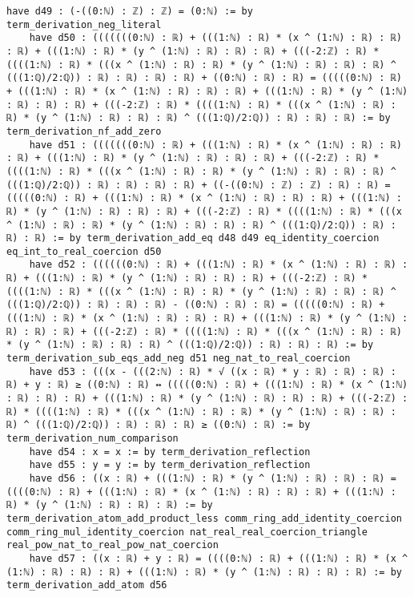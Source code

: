\documentclass{article}
\begin{document}
\begin{tcolorbox}[colback=white!10, width=\linewidth]
\begin{lstlisting}[language=Lean4]
    have d49 : (-((0:ℕ) : ℤ) : ℤ) = (0:ℕ) := by term_derivation_neg_literal
    have d50 : (((((((0:ℕ) : ℝ) + (((1:ℕ) : ℝ) * (x ^ (1:ℕ) : ℝ) : ℝ) : ℝ) + (((1:ℕ) : ℝ) * (y ^ (1:ℕ) : ℝ) : ℝ) : ℝ) + (((-2:ℤ) : ℝ) * ((((1:ℕ) : ℝ) * (((x ^ (1:ℕ) : ℝ) : ℝ) * (y ^ (1:ℕ) : ℝ) : ℝ) : ℝ) ^ (((1:ℚ)/2:ℚ)) : ℝ) : ℝ) : ℝ) : ℝ) + ((0:ℕ) : ℝ) : ℝ) = (((((0:ℕ) : ℝ) + (((1:ℕ) : ℝ) * (x ^ (1:ℕ) : ℝ) : ℝ) : ℝ) + (((1:ℕ) : ℝ) * (y ^ (1:ℕ) : ℝ) : ℝ) : ℝ) + (((-2:ℤ) : ℝ) * ((((1:ℕ) : ℝ) * (((x ^ (1:ℕ) : ℝ) : ℝ) * (y ^ (1:ℕ) : ℝ) : ℝ) : ℝ) ^ (((1:ℚ)/2:ℚ)) : ℝ) : ℝ) : ℝ) := by term_derivation_nf_add_zero
    have d51 : (((((((0:ℕ) : ℝ) + (((1:ℕ) : ℝ) * (x ^ (1:ℕ) : ℝ) : ℝ) : ℝ) + (((1:ℕ) : ℝ) * (y ^ (1:ℕ) : ℝ) : ℝ) : ℝ) + (((-2:ℤ) : ℝ) * ((((1:ℕ) : ℝ) * (((x ^ (1:ℕ) : ℝ) : ℝ) * (y ^ (1:ℕ) : ℝ) : ℝ) : ℝ) ^ (((1:ℚ)/2:ℚ)) : ℝ) : ℝ) : ℝ) : ℝ) + ((-((0:ℕ) : ℤ) : ℤ) : ℝ) : ℝ) = (((((0:ℕ) : ℝ) + (((1:ℕ) : ℝ) * (x ^ (1:ℕ) : ℝ) : ℝ) : ℝ) + (((1:ℕ) : ℝ) * (y ^ (1:ℕ) : ℝ) : ℝ) : ℝ) + (((-2:ℤ) : ℝ) * ((((1:ℕ) : ℝ) * (((x ^ (1:ℕ) : ℝ) : ℝ) * (y ^ (1:ℕ) : ℝ) : ℝ) : ℝ) ^ (((1:ℚ)/2:ℚ)) : ℝ) : ℝ) : ℝ) := by term_derivation_add_eq d48 d49 eq_identity_coercion eq_int_to_real_coercion d50
    have d52 : ((((((0:ℕ) : ℝ) + (((1:ℕ) : ℝ) * (x ^ (1:ℕ) : ℝ) : ℝ) : ℝ) + (((1:ℕ) : ℝ) * (y ^ (1:ℕ) : ℝ) : ℝ) : ℝ) + (((-2:ℤ) : ℝ) * ((((1:ℕ) : ℝ) * (((x ^ (1:ℕ) : ℝ) : ℝ) * (y ^ (1:ℕ) : ℝ) : ℝ) : ℝ) ^ (((1:ℚ)/2:ℚ)) : ℝ) : ℝ) : ℝ) - ((0:ℕ) : ℝ) : ℝ) = (((((0:ℕ) : ℝ) + (((1:ℕ) : ℝ) * (x ^ (1:ℕ) : ℝ) : ℝ) : ℝ) + (((1:ℕ) : ℝ) * (y ^ (1:ℕ) : ℝ) : ℝ) : ℝ) + (((-2:ℤ) : ℝ) * ((((1:ℕ) : ℝ) * (((x ^ (1:ℕ) : ℝ) : ℝ) * (y ^ (1:ℕ) : ℝ) : ℝ) : ℝ) ^ (((1:ℚ)/2:ℚ)) : ℝ) : ℝ) : ℝ) := by term_derivation_sub_eqs_add_neg d51 neg_nat_to_real_coercion
    have d53 : (((x - (((2:ℕ) : ℝ) * √ ((x : ℝ) * y : ℝ) : ℝ) : ℝ) : ℝ) + y : ℝ) ≥ ((0:ℕ) : ℝ) ↔ (((((0:ℕ) : ℝ) + (((1:ℕ) : ℝ) * (x ^ (1:ℕ) : ℝ) : ℝ) : ℝ) + (((1:ℕ) : ℝ) * (y ^ (1:ℕ) : ℝ) : ℝ) : ℝ) + (((-2:ℤ) : ℝ) * ((((1:ℕ) : ℝ) * (((x ^ (1:ℕ) : ℝ) : ℝ) * (y ^ (1:ℕ) : ℝ) : ℝ) : ℝ) ^ (((1:ℚ)/2:ℚ)) : ℝ) : ℝ) : ℝ) ≥ ((0:ℕ) : ℝ) := by term_derivation_num_comparison
    have d54 : x = x := by term_derivation_reflection
    have d55 : y = y := by term_derivation_reflection
    have d56 : ((x : ℝ) + (((1:ℕ) : ℝ) * (y ^ (1:ℕ) : ℝ) : ℝ) : ℝ) = ((((0:ℕ) : ℝ) + (((1:ℕ) : ℝ) * (x ^ (1:ℕ) : ℝ) : ℝ) : ℝ) + (((1:ℕ) : ℝ) * (y ^ (1:ℕ) : ℝ) : ℝ) : ℝ) := by term_derivation_atom_add_product_less comm_ring_add_identity_coercion comm_ring_mul_identity_coercion nat_real_real_coercion_triangle real_pow_nat_to_real_pow_nat_coercion
    have d57 : ((x : ℝ) + y : ℝ) = ((((0:ℕ) : ℝ) + (((1:ℕ) : ℝ) * (x ^ (1:ℕ) : ℝ) : ℝ) : ℝ) + (((1:ℕ) : ℝ) * (y ^ (1:ℕ) : ℝ) : ℝ) : ℝ) := by term_derivation_add_atom d56

\end{lstlisting}
\end{tcolorbox}
\end{document}
